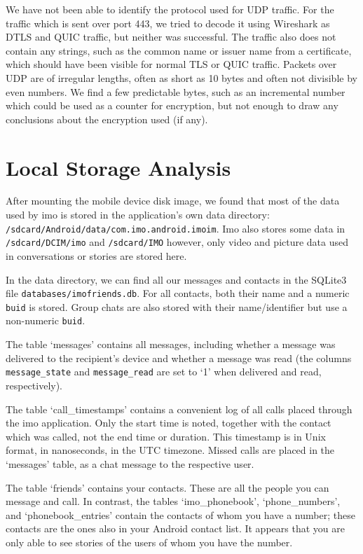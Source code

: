 \documentclass[conference]{IEEEtran}
\begin{document}
We have not been able to identify the protocol used for UDP traffic. For the
traffic which is sent over port 443, we tried to decode it using Wireshark as
DTLS and QUIC traffic, but neither was successful. The traffic also does not
contain any strings, such as the common name or issuer name from a certificate,
which should have been visible for normal TLS or QUIC traffic. Packets over UDP
are of irregular lengths, often as short as 10 bytes and often not divisible by
even numbers. We find a few predictable bytes, such as an incremental number
which could be used as a counter for encryption, but not enough to draw any
conclusions about the encryption used (if any).


\section{Local Storage Analysis}\label{sec:storage}

After mounting the mobile device disk image, we found that most of the data used
by imo is stored in the application's own data directory:
\texttt{/sdcard/Android/data/com.imo.android.imoim}. Imo also stores some data
in \texttt{/sdcard/DCIM/imo} and \texttt{/sdcard/IMO} however, only video and
picture data used in conversations or stories are stored here.

In the data directory, we can find all our messages and contacts in the SQLite3
file \texttt{databases/imofriends.db}. For all contacts, both their name and a
numeric \texttt{buid} is stored. Group chats are also stored with their
name/identifier but use a non-numeric \texttt{buid}.

The table `messages' contains all messages, including whether a message was
delivered to the recipient's device and whether a message was read (the columns
\texttt{message\_state} and \texttt{message\_read} are set to `1' when
delivered and read, respectively).

The table `call\_timestamps' contains a convenient log of all calls placed
through the imo application. Only the start time is noted, together with the
contact which was called, not the end time or duration. This timestamp is in
Unix format, in nanoseconds, in the UTC timezone. Missed calls are placed in
the `messages' table, as a chat message to the respective user.

The table `friends' contains your contacts. These are all the people you can
message and call. In contrast, the tables `imo\_phonebook', `phone\_numbers',
and `phonebook\_entries' contain the contacts of whom you have a number; these
contacts are the ones also in your Android contact list. It appears that you
are only able to see stories of the users of whom you have the number.
\end{document}
